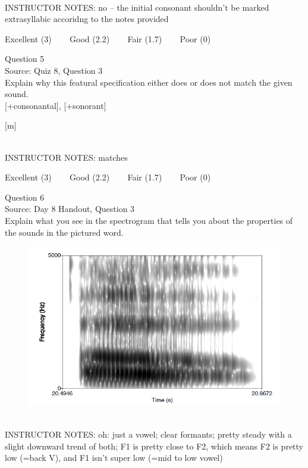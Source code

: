 \documentclass[12pt]{article}
\begin{document}
~\\
INSTRUCTOR NOTES: no -- the initial consonant shouldn't be marked extrasyllabic accoridng to the notes provided


\vfill
Excellent (3) ~~~ Good (2.2) ~~~ Fair (1.7) ~~~ Poor (0)
\newpage

{\large Question 5}\\

Source: Quiz 8, Question 3\\

Explain why this featural specification either does or does not match the given sound.\\

{[+consonantal]}, {[+sonorant]}

{[m]}


~\\
INSTRUCTOR NOTES: matches


\vfill
Excellent (3) ~~~ Good (2.2) ~~~ Fair (1.7) ~~~ Poor (0)
\newpage

{\large Question 6}\\

Source: Day 8 Handout, Question 3\\

Explain what you see in the spectrogram that tells you about the properties of the sounds in the pictured word.\\

\begin{figure}[H]
\includegraphics{../images/spectrogram_oh.png}
\end{figure}

~\\
INSTRUCTOR NOTES: oh: just a vowel; clear formants; pretty steady with a slight downward trend of both; F1 is pretty close to F2, which means F2 is pretty low (=back V), and F1 isn't super low (=mid to low vowel)
\end{document}
